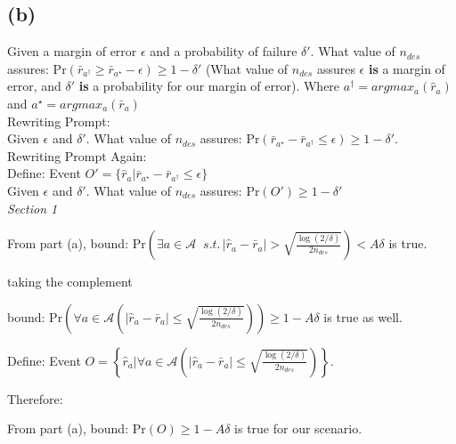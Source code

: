 \documentclass{article}
\begin{document}
\subsection*{(b)}
Given a margin of error $\epsilon$ and a probability of failure $\delta'$. What value of $n_{des}$ assures: $\mathrm{Pr}\left(\bar{r}_{a^{\dagger}} \geq \bar{r}_{a^{\star}} - \epsilon\right) \geq 1 - \delta'$ (What value of $n_{des}$ assures $\epsilon$ \textbf{is} a margin of error, and $\delta'$ \textbf{is} a probability for our margin of error). Where $a^{\dagger} = argmax_{a}(\hat{r}_{a})$ and $a^{\star} = argmax_{a}(\bar{r}_{a})$ \\

\noindent Rewriting Prompt: \\

\noindent Given $\epsilon$ and $\delta'$. What value of $n_{des}$ assures: $\mathrm{Pr}\left(\bar{r}_{a^{\star}} - \bar{r}_{a^{\dagger}} \leq  \epsilon\right) \geq 1 - \delta'$. \\

\noindent Rewriting Prompt Again: \\

\noindent Define: Event $O' = \bigg\{\hat{r}_{a} | \bar{r}_{a^{\star}} - \bar{r}_{a^{\dagger}} \leq \epsilon\bigg\}$ \\

\noindent Given $\epsilon$ and $\delta'$. What value of $n_{des}$ assures: $\mathrm{Pr}\left(O'\right) \geq 1 - \delta'$ \\

\textit{Section 1}

From part (a), bound: $\mathrm{Pr}\left(\exists a \in \mathcal{A} \; \; s.t. \, \left|\hat{r}_{a} - \bar{r}_{a} \right| > \sqrt{\frac{\log (2/\delta)}{2n_{des}}} \right) < A\delta$ is true.

taking the complement 

bound: $\mathrm{Pr}\left(\forall a \in \mathcal{A} \left(\left|\hat{r}_{a} - \bar{r}_{a} \right| \leq \sqrt{\frac{\log (2/\delta)}{2n_{des}}}\right) \right) \geq 1 - A\delta$ is true as well.

Define: Event $O = \left\{\hat{r}_{a} | \forall a \in \mathcal{A} \left(\left|\hat{r}_{a} - \bar{r}_{a} \right| \leq \sqrt{\frac{\log (2/\delta)}{2n_{des}}}\right)\right\}$.

Therefore: 

From part (a), bound: $\mathrm{Pr}\left(O\right) \geq 1 - A\delta$ is true for our scenario.\\
\end{document}
